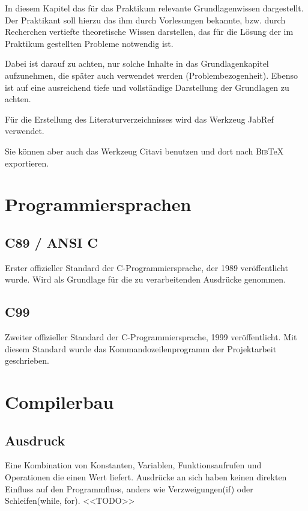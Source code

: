 \documentclass[oneside]{ausarbeitung}
\begin{document}
In diesem Kapitel das für das Praktikum relevante Grundlagenwissen 
dargestellt. Der Praktikant soll hierzu das ihm durch Vorlesungen 
bekannte, bzw. durch Recherchen vertiefte theoretische Wissen 
darstellen, das für die Lösung der im Praktikum gestellten Probleme 
notwendig ist.

Dabei ist darauf zu achten, nur solche Inhalte in das Grundlagenkapitel 
aufzunehmen, die später auch verwendet werden (Problembezogenheit). 
Ebenso ist auf eine ausreichend tiefe und vollständige Darstellung der 
Grundlagen zu achten.

Für die Erstellung des Literaturverzeichnisses 
wird das Werkzeug JabRef\autocite{JabRef:JabRef} verwendet. 

Sie können aber auch das Werkzeug Citavi\autocite{SAS:Citavi} benutzen
und dort nach \textsc{Bib}\TeX{} exportieren.

\section{Programmiersprachen}
\label{sec:prog_langs}

\subsection{C89 / ANSI C}
\label{sub:c89}
Erster offizieller Standard der C-Programmiersprache, der 1989 veröffentlicht wurde. Wird als Grundlage für die zu verarbeitenden Ausdrücke genommen.

\subsection{C99}
\label{sub:c99}
Zweiter offizieller Standard der C-Programmiersprache, 1999 veröffentlicht. Mit diesem Standard wurde das Kommandozeilenprogramm der Projektarbeit geschrieben.

\section{Compilerbau}

\subsection{Ausdruck}
\label{sub:expression}
Eine Kombination von Konstanten, Variablen, Funktionsaufrufen und Operationen die einen Wert liefert.
Ausdrücke an sich haben keinen direkten Einfluss auf den Programmfluss, anders wie Verzweigungen(if) oder Schleifen(while, for). <<TODO>>
\end{document}
